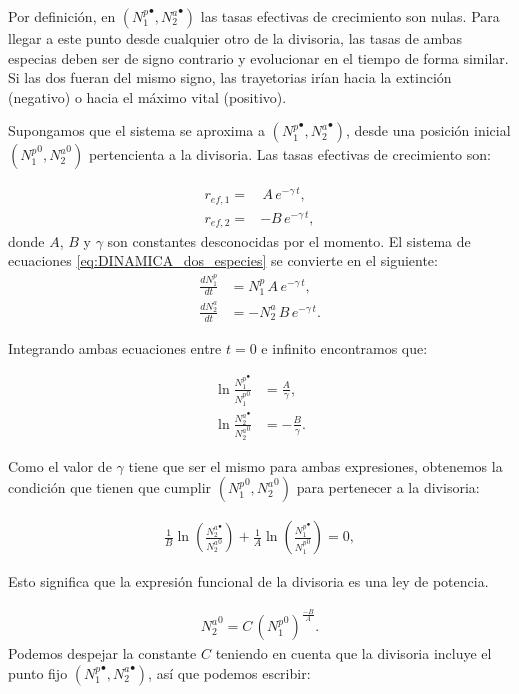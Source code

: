 Por definición, en $({N_1^p}^\bullet,{N_2^a}^\bullet)$ las tasas efectivas de crecimiento son nulas. Para llegar a este punto desde cualquier otro de la divisoria, las tasas de ambas especias deben ser de signo contrario y evolucionar en el tiempo de forma similar. Si las dos fueran del mismo signo, las trayetorias irían hacia la extinción (negativo) o hacia el máximo vital (positivo). 

Supongamos que el sistema se aproxima a $({N_1^p}^\bullet,{N_2^a}^\bullet)$, desde una posición inicial $({N_1^p}^0,{N_2^a}^0)$ pertencienta a la divisoria. Las tasas efectivas de crecimiento son:

\begin{align}
r_{ef,1}  = & \, A \, e^{-\gamma\, t} ,\nonumber\\  
r_{ef,2}  = & -B\, e^{-\gamma\, t} , 
\label{eq:coeffsreffs}
\end{align}
donde $A$, $B$ y $\gamma$ son constantes desconocidas por el momento. El sistema de ecuaciones \ref{eq:DINAMICA_dos_especies} se convierte en el siguiente:
\begin{align}
\frac{dN^p_{1}}{dt} & = N^p_{1} \, A \, e^{-\gamma \, t} , \nonumber \\
\frac{dN^a_{2}}{dt} & = -N^a_{2}\, B \, e^{-\gamma \, t} .
\label{eq:coeffsreffs_2}
\end{align}

Integrando ambas ecuaciones entre $t = 0$ e infinito  encontramos que:

\begin{align}
 \ln \frac{{N_1^p}^\bullet}{{N_{1}^p}^0} & = \frac{A}{\gamma} , \nonumber\\ 
 \ln \frac{{N_2^a}^\bullet}{{N_{2}^a}^0} & = - \frac{B}{\gamma} .
\label{eq:coeffsreffs_3}
\end{align}

Como el valor de $\gamma$ tiene que ser el mismo para ambas expresiones, obtenemos la condición que tienen que cumplir $({N_1^p}^0,{N_2^a}^0)$ para pertenecer a la divisoria:

\begin{align}
\frac{1}{B} \ln \left(\frac{{N_{2}^a}^\bullet}{{N_{2}^a}^0} \right) + \frac{1}{A} \ln \left(\frac{{N_1^p}^\bullet}{{N_1^p}^0} \right) = 0 ,
\label{eq:coeffsreffs_4}
\end{align}

Esto significa que la expresión funcional de la divisoria es una ley de potencia.

\begin{align}
{N_2^a}^0 = C\, ({N_1^p}^0)^\frac{-B}{A}. 
\label{eq:powerlaw}
\end{align}
Podemos despejar la constante $C$ teniendo en cuenta que la divisoria incluye el punto fijo $({N_1^p}^\bullet,{N_2^a}^\bullet)$, así que podemos escribir:

